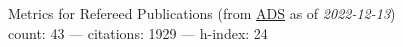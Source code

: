 Metrics for Refereed Publications (from \href{\adsurl}{ADS} as of \textit{2022-12-13}) \\count: 43 --- citations: 1929 --- h-index: 24